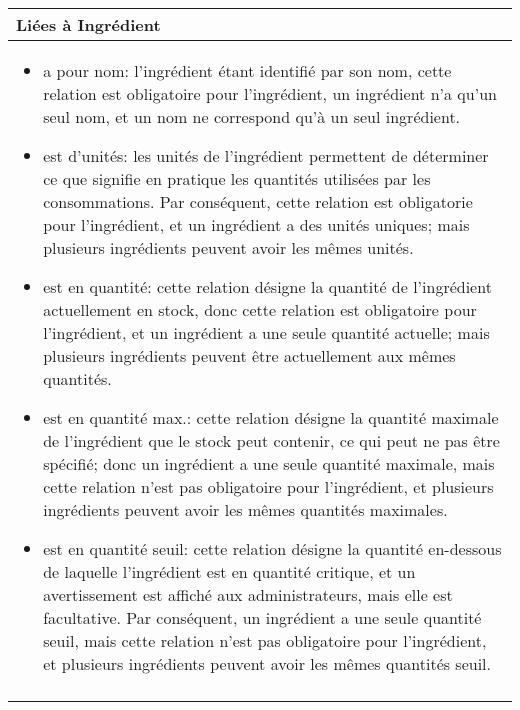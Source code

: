 \documentclass[a4paper,10pt]{article}
\begin{document}
\begin{tabu}{X}
\textbf{Liées à Ingrédient}\\
\toprule

\begin{itemize}
    \item a pour nom: l'ingrédient étant identifié par son nom, cette relation est obligatoire pour l'ingrédient, un ingrédient n'a qu'un seul nom, et un nom ne correspond qu'à un seul ingrédient.
    \item est d'unités: les unités de l'ingrédient permettent de déterminer ce que signifie en pratique les quantités utilisées par les consommations. Par conséquent, cette relation est obligatorie pour l'ingrédient, et un ingrédient a des unités uniques; mais plusieurs ingrédients peuvent avoir les mêmes unités.
    \item est en quantité: cette relation désigne la quantité de l'ingrédient actuellement en stock, donc cette relation est obligatoire pour l'ingrédient, et un ingrédient a une seule quantité actuelle; mais plusieurs ingrédients peuvent être actuellement aux mêmes quantités.
    \item est en quantité max.: cette relation désigne la quantité maximale de l'ingrédient que le stock peut contenir, ce qui peut ne pas être spécifié; donc un ingrédient a une seule quantité maximale, mais cette relation n'est pas obligatoire pour l'ingrédient, et plusieurs ingrédients peuvent avoir les mêmes quantités maximales.
    \item est en quantité seuil: cette relation désigne la quantité en-dessous de laquelle l'ingrédient est en quantité critique, et un avertissement est affiché aux administrateurs, mais elle est facultative. Par conséquent, un ingrédient a une seule quantité seuil, mais cette relation n'est pas obligatoire pour l'ingrédient, et plusieurs ingrédients peuvent avoir les mêmes quantités seuil.
\end{itemize}
\\\\
\end{tabu}
\end{document}
